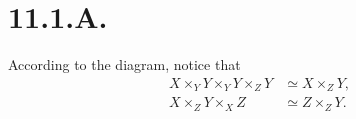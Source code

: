 \section{11.1.A.}

According to the diagram, notice that 
\begin{align*}
    X\times_Y Y \times_Y Y\times_Z Y &\simeq X\times_Z Y,\\
    X\times_Z Y \times_X Z &\simeq Z\times_Z Y.
\end{align*}